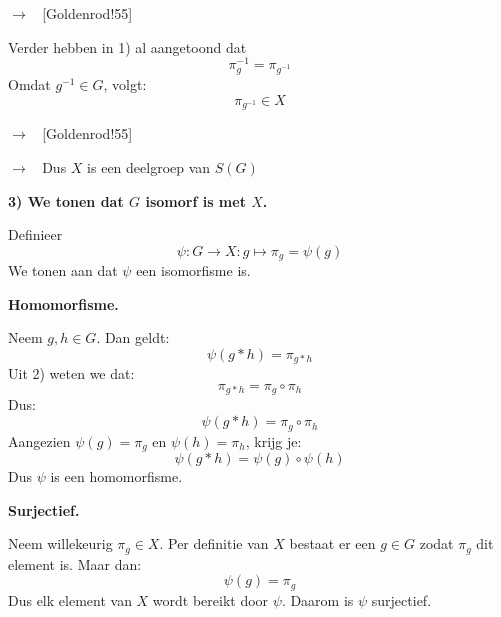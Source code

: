 \begin{nicetheorem}
    $\to\;\;$ [Goldenrod!55]
    
    Verder hebben in 1) al aangetoond dat
    \begin{equation*}
        \pi_g^{-1} = \pi_{g^{-1}}
    \end{equation*}
    Omdat $g^{-1} \in G$, volgt:
    \begin{equation*}
        \pi_{g^{-1}} \in X
    \end{equation*}
    
    $\to\;\;$ [Goldenrod!55]

    $\to\;\;$ Dus $X$ is een deelgroep van $S(G)$

    \textbf{3) We tonen dat $G$ isomorf is met $X$.}

    Definieer
    \begin{equation*}
        \psi : G \to X : g \mapsto \pi_g = \psi(g)
    \end{equation*}
    We tonen aan dat $\psi$ een isomorfisme is.

    \vspace{0.15cm}

    \textbf{Homomorfisme.}

    Neem $g,h \in G$. Dan geldt:
    \begin{equation*}
        \psi(g*h) = \pi_{g*h}
    \end{equation*}
    Uit 2) weten we dat:
    \begin{equation*}
        \pi_{g*h} = \pi_g \circ \pi_h
    \end{equation*}
    Dus:
    \begin{equation*}
        \psi(g*h) = \pi_g \circ \pi_h
    \end{equation*}
    Aangezien $\psi(g) = \pi_g$ en $\psi(h) = \pi_h$, krijg je:
    \begin{equation*}
        \psi(g*h) = \psi(g) \circ \psi(h)
    \end{equation*}
    Dus $\psi$ is een homomorfisme.

    \vspace{0.15cm}

    \textbf{Surjectief.}

    Neem willekeurig $\pi_g\in X$. Per definitie van $X$ bestaat er een $g\in G$ zodat $\pi_g$ dit element is. Maar dan:
    \begin{equation*}
        \psi(g) = \pi_g
    \end{equation*}
    Dus elk element van $X$ wordt bereikt door $\psi$. Daarom is $\psi$ surjectief.


\end{nicetheorem}

